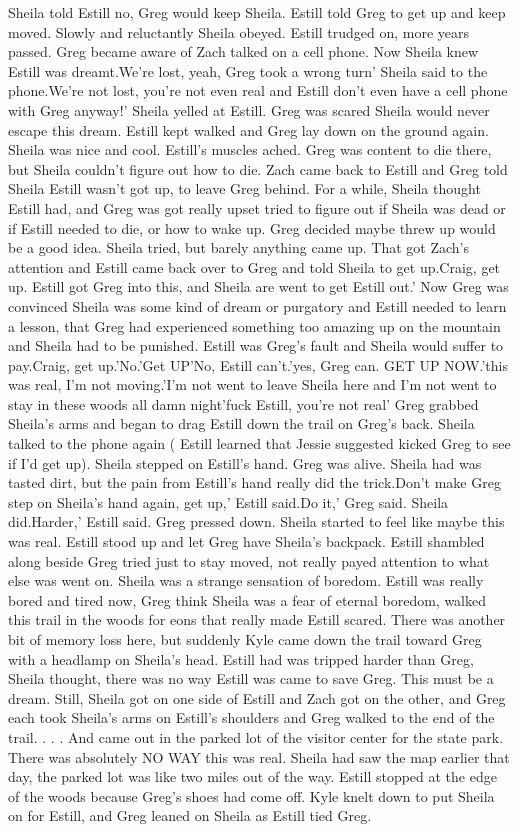\documentclass[12pt]{book}
\begin{document}
Sheila told Estill no, Greg would keep Sheila. Estill told Greg to get up and keep moved. Slowly and reluctantly Sheila obeyed. Estill trudged on, more years passed. Greg became aware of Zach talked on a cell phone. Now Sheila knew Estill was dreamt.We're lost, yeah, Greg took a wrong turn' Sheila said to the phone.We're not lost, you're not even real and Estill don't even have a cell phone with Greg anyway!' Sheila yelled at Estill. Greg was scared Sheila would never escape this dream. Estill kept walked and Greg lay down on the ground again. Sheila was nice and cool. Estill's muscles ached. Greg was content to die there, but Sheila couldn't figure out how to die. Zach came back to Estill and Greg told Sheila Estill wasn't got up, to leave Greg behind. For a while, Sheila thought Estill had, and Greg was got really upset tried to figure out if Sheila was dead or if Estill needed to die, or how to wake up. Greg decided maybe threw up would be a good idea. Sheila tried, but barely anything came up. That got Zach's attention and Estill came back over to Greg and told Sheila to get up.Craig, get up. Estill got Greg into this, and Sheila are went to get Estill out.' Now Greg was convinced Sheila was some kind of dream or purgatory and Estill needed to learn a lesson, that Greg had experienced something too amazing up on the mountain and Sheila had to be punished. Estill was Greg's fault and Sheila would suffer to pay.Craig, get up.'No.'Get UP'No, Estill can't.'yes, Greg can. GET UP NOW.'this was real, I'm not moving.'I'm not went to leave Sheila here and I'm not went to stay in these woods all damn night'fuck Estill, you're not real' Greg grabbed Sheila's arms and began to drag Estill down the trail on Greg's back. Sheila talked to the phone again ( Estill learned that Jessie suggested kicked Greg to see if I'd get up). Sheila stepped on Estill's hand. Greg was alive. Sheila had was tasted dirt, but the pain from Estill's hand really did the trick.Don't make Greg step on Sheila's hand again, get up,' Estill said.Do it,' Greg said. Sheila did.Harder,' Estill said. Greg pressed down. Sheila started to feel like maybe this was real. Estill stood up and let Greg have Sheila's backpack. Estill shambled along beside Greg tried just to stay moved, not really payed attention to what else was went on. Sheila was a strange sensation of boredom. Estill was really bored and tired now, Greg think Sheila was a fear of eternal boredom, walked this trail in the woods for eons that really made Estill scared. There was another bit of memory loss here, but suddenly Kyle came down the trail toward Greg with a headlamp on Sheila's head. Estill had was tripped harder than Greg, Sheila thought, there was no way Estill was came to save Greg. This must be a dream. Still, Sheila got on one side of Estill and Zach got on the other, and Greg each took Sheila's arms on Estill's shoulders and Greg walked to the end of the trail.  . . .  And came out in the parked lot of the visitor center for the state park. There was absolutely NO WAY this was real. Sheila had saw the map earlier that day, the parked lot was like two miles out of the way. Estill stopped at the edge of the woods because Greg's shoes had come off. Kyle knelt down to put Sheila on for Estill, and Greg leaned on Sheila as Estill tied Greg. 
\end{document}
